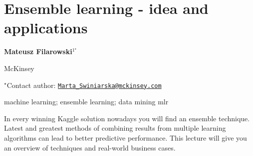 \documentclass[\main/boa.tex]{subfiles}
\begin{document}
\pagestyle{empty}

\section{Ensemble learning - idea and applications}

\begin{center}
  {\bf Mateusz Filarowski$^{1^\star}$}
\end{center}

\vskip 0.3cm

\begin{affiliations}
\begin{enumerate}
\begin{minipage}{0.915\textwidth}
\centering
\item McKinsey \\[-2pt]
\end{minipage}
\end{enumerate}
$^\star$Contact author: \href{mailto:Marta_Swiniarska@mckinsey.com}{\nolinkurl{Marta\_Swiniarska@mckinsey.com}}\\
\end{affiliations}

\vskip 0.5cm

\begin{minipage}{0.915\textwidth}
\keywords machine learning; ensemble learning; data mining
\packages mlr
\end{minipage}

\vskip 0.8cm

In every winning Kaggle solution nowadays you will find an ensemble
technique. Latest and greatest methods of combining results from
multiple learning algorithms can lead to better predictive performance.
This lecture will give you an overview of techniques and real-world
business cases.
\end{document}
